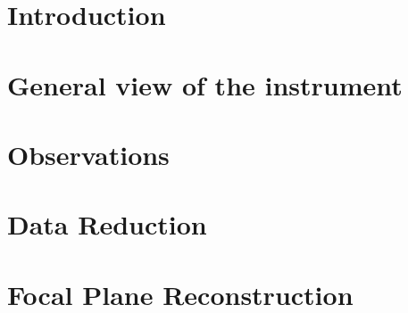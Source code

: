 \documentclass{aa}
\begin{document}

   \maketitle

   
\section{Introduction}
\label{se:intro}



\section{General view of the instrument}
\label{se:instru}



\section{Observations}
\label{se:observations}



\section{Data Reduction}
\label{se:dataproc}


\section{Focal Plane Reconstruction}
\label{se:geometry}

\end{document}
